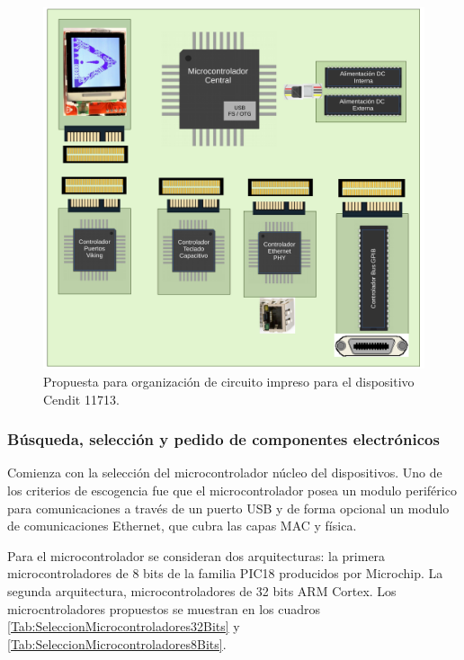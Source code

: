 \documentclass[paper=letter,oneside,fontsize=12pt, parskip=full]{article}
\begin{document}
	\begin{figure}[h!]
		\centering
		\includegraphics[width=17cm]{Imagenes/EsquemaCircuitoImpresoCendit11713_2.pdf}
		\caption{Propuesta para organización de circuito impreso para el dispositivo Cendit 11713.}	
	\end{figure}


	\begin{figure}[h!]
		\centering
	\end{figure}


	\subsubsection{Búsqueda, selección y pedido de componentes electrónicos}
	
	Comienza con la selección del microcontrolador núcleo del dispositivos. Uno de los criterios de escogencia fue que el microcontrolador posea un modulo periférico para comunicaciones a través de un puerto USB y de forma opcional un modulo de comunicaciones Ethernet, que cubra las capas MAC y física.
	
	Para el microcontrolador se consideran dos arquitecturas: la primera microcontroladores de 8 bits de la familia PIC18 producidos por Microchip. La segunda arquitectura, microcontroladores de 32 bits ARM Cortex. Los microcntroladores propuestos se muestran en los cuadros \ref{Tab:SeleccionMicrocontroladores32Bits} y \ref{Tab:SeleccionMicrocontroladores8Bits}.
	
\end{document}
